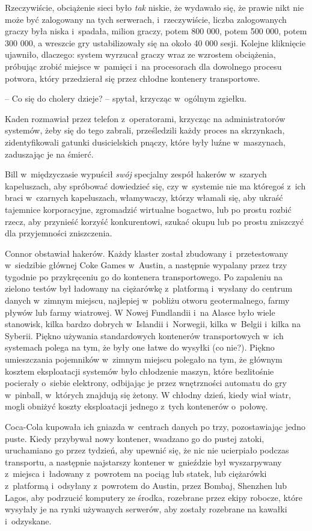 \documentclass[oneside,polish,11pt,rmheadings]{mwbk}
\begin{document}
Rzeczywiście, obciążenie sieci było \textit{tak }niskie, że wydawało się, że prawie nikt nie może być zalogowany na tych serwerach, i~rzeczywiście, liczba zalogowanych graczy była niska i~spadała, milion graczy, potem 800 000, potem 500 000, potem 300 000, a wreszcie gry ustabilizowały się na około 40 000 sesji. Kolejne kliknięcie ujawniło, dlaczego: system wyrzucał graczy wraz ze wzrostem obciążenia, próbując zrobić miejsce w~pamięci i~na procesorach dla dowolnego procesu potwora, który przedzierał się przez chłodne kontenery transportowe.

-- Co się do cholery dzieje? -- spytał, krzycząc w~ogólnym zgiełku. 

Kaden rozmawiał przez telefon z~operatorami, krzycząc na administratorów systemów, żeby się do tego zabrali, prześledzili każdy proces na skrzynkach, zidentyfikowali gatunki dusicielskich pnączy, które były luźne w~maszynach, zaduszając je na śmierć.

Bill w~międzyczasie wypuścił \textit{swój }specjalny zespół hakerów w~szarych kapeluszach, aby spróbować dowiedzieć się, czy w~systemie nie ma któregoś z~ich braci w~czarnych kapeluszach, włamywaczy, którzy włamali się, aby ukraść tajemnice korporacyjne, zgromadzić wirtualne bogactwo, lub po prostu rozbić rzecz, aby przynieść korzyść konkurentowi, szukać okupu lub po prostu zniszczyć dla przyjemności zniszczenia.

Connor obstawiał hakerów. Każdy klaster został zbudowany i~przetestowany w~siedzibie głównej Coke Games w~Austin, a następnie wypalany przez trzy tygodnie po przykręceniu go do kontenera transportowego. Po zapaleniu na zielono testów był ładowany na ciężarówkę z~platformą i~wysłany do centrum danych w~zimnym miejscu, najlepiej w~pobliżu otworu geotermalnego, farmy pływów lub farmy wiatrowej. W Nowej Fundlandii i~na Alasce było wiele stanowisk, kilka bardzo dobrych w~Islandii i~Norwegii, kilka w~Belgii i~kilka na Syberii. Piękno używania standardowych kontenerów transportowych w~ich systemach polega na tym, że były one łatwe do wysyłki (co nie?). Piękno umieszczania pojemników w~zimnym miejscu polegało na tym, że głównym kosztem eksploatacji systemów było chłodzenie maszyn, które bezlitośnie pocierały o~siebie elektrony, odbijając je przez wnętrzności automatu do gry w~pinball, w~których znajdują się żetony. W chłodny dzień, kiedy wiał wiatr, mogli obniżyć koszty eksploatacji jednego z~tych kontenerów o~połowę.

Coca-Cola kupowała ich gniazda w~centrach danych po trzy, pozostawiając jedno puste. Kiedy przybywał nowy kontener, wsadzano go do pustej zatoki, uruchamiano go przez tydzień, aby upewnić się, że nic nie ucierpiało podczas transportu, a następnie najstarszy kontener w~gnieździe był wyszarpywany z~miejsca i~ładowany z~powrotem na pociąg lub statek, lub ciężarówki z~platformą i~odsyłany z~powrotem do Austin, przez Bombaj, Shenzhen lub Lagos, aby podrzucić komputery ze środka, rozebrane przez ekipy robocze, które wysyłały je na rynki używanych serwerów, aby zostały rozebrane na kawałki i~odzyskane.
\end{document}
